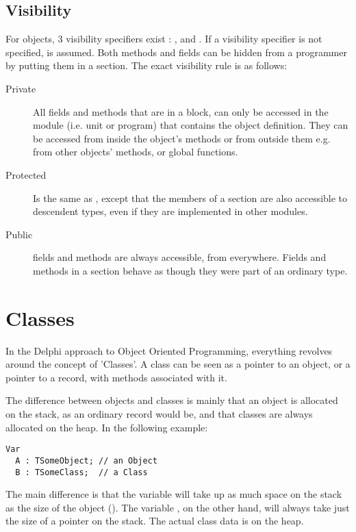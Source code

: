 \section{Visibility}
For objects, 3 visibility specifiers exist : ,  and
. If a visibility specifier is not specified, 
is assumed.
Both methods and fields can be hidden from a programmer by putting them
in a  section. The exact visibility rule is as follows:
\begin{description}
\item [Private\ ] All fields and methods that are in a  block,
can  only be accessed in the module (i.e. unit or program) that contains
the object definition.
They can be accessed from inside the object's methods or from outside them
e.g. from other objects' methods, or global functions.
\item [Protected\ ] Is the same as , except that the members of
a  section are also accessible to descendent types, even if
they are implemented in other modules.
\item [Public\ ] fields and methods are always accessible, from everywhere.
Fields and methods in a  section behave as though they were part
of an ordinary  type.
\end{description}


\chapter{Classes}
\label{ch:Classes}
In the Delphi approach to Object Oriented Programming, everything revolves
around  the concept of 'Classes'.  A class can be seen as a pointer to an
object, or a pointer to a record, with methods associated with it.

The difference between objects and classes is mainly that an object
is allocated on the stack, as an ordinary record would be, and that
classes are always allocated on the heap. In the following example:
\begin{verbatim}
Var
  A : TSomeObject; // an Object
  B : TSomeClass;  // a Class
\end{verbatim}
The main difference is that the variable  will take up as much 
space on the stack as the size of the object (). The
variable , on the other hand, will always take just the size of
a pointer on the stack. The actual class data is on the heap.

